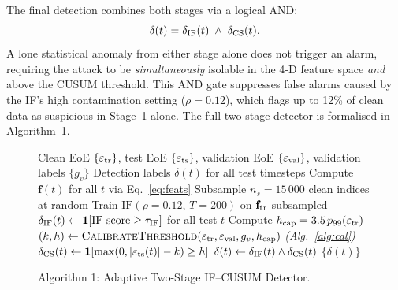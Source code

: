 \documentclass[journal]{IEEEtran}
\begin{document}
The final detection combines both stages via a logical AND:
\begin{equation}
  \delta(t) = \delta_{\rm IF}(t) \;\wedge\; \delta_{\rm CS}(t).
  \label{eq:combined}
\end{equation}
A lone statistical anomaly from either stage alone does not
trigger an alarm, requiring the attack to be \emph{simultaneously}
isolable in the 4-D feature space \emph{and} above the CUSUM
threshold.
This AND gate suppresses false alarms caused by the IF's high
contamination setting ($\rho=0.12$), which flags up to 12\%
of clean data as suspicious in Stage~1 alone.
The full two-stage detector is formalised in Algorithm~\ref{alg:det}.

\begin{figure}[!t]
\centering
\begin{minipage}{0.97\columnwidth}
\begin{algorithmic}[1]
\renewcommand{\algorithmicrequire}{\textbf{Input:}}
\renewcommand{\algorithmicensure}{\textbf{Output:}}
\REQUIRE Clean EoE $\{\varepsilon_{\rm tr}\}$,
         test EoE $\{\varepsilon_{\rm ts}\}$,
         validation EoE $\{\varepsilon_{\rm val}\}$,
         validation labels $\{g_v\}$
\ENSURE  Detection labels $\delta(t)$ for all test timesteps
\STATE Compute $\mathbf{f}(t)$ for all $t$ via Eq.~\eqref{eq:feats}
\STATE Subsample $n_s=15\,000$ clean indices at random
\STATE Train $\text{IF}(\rho=0.12,\,T=200)$ on $\mathbf{f}_{\rm tr}$ subsampled
\STATE $\delta_{\rm IF}(t) \leftarrow \mathbf{1}[\text{IF score} \geq \tau_{\rm IF}]$
       for all test $t$
\STATE Compute $h_{\rm cap} = 3.5\,p_{99}(\varepsilon_{\rm tr})$
\STATE $(k,h) \leftarrow \textsc{CalibrateThreshold}(\varepsilon_{\rm tr},
       \varepsilon_{\rm val}, g_v, h_{\rm cap})$ \hfill\textit{(Alg.~\ref{alg:cal})}
\STATE $\delta_{\rm CS}(t) \leftarrow
       \mathbf{1}[\max(0,|\varepsilon_{\rm ts}(t)|-k)\geq h]$
\STATE $\delta(t) \leftarrow \delta_{\rm IF}(t) \wedge \delta_{\rm CS}(t)$
\RETURN $\{\delta(t)\}$
\end{algorithmic}
\end{minipage}
\caption{Algorithm 1: Adaptive Two-Stage IF--CUSUM Detector.}
\label{alg:det}
\end{figure}
\end{document}
